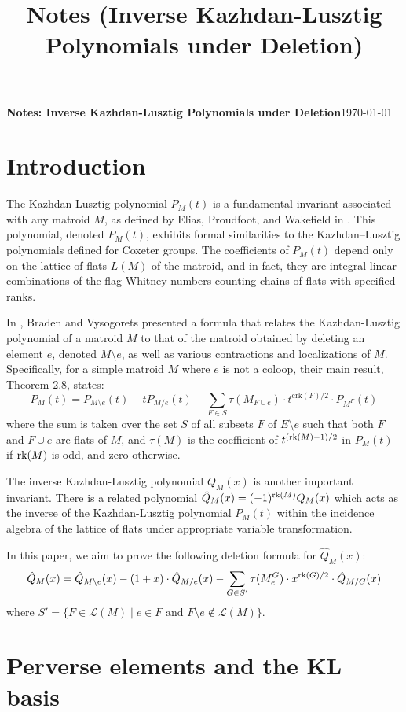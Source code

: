 \documentclass[10pt]{article}
\title{Notes (Inverse Kazhdan-Lusztig Polynomials under Deletion)}
\newcommand{\calL}{\mathcal{L}}
\newcommand{\rank}{\normalfont\text{rk}}
\theoremstyle{remark}
\begin{document}
{\textbf{Notes: Inverse Kazhdan-Lusztig Polynomials under Deletion}}\hfill {\small{\today}}

\hrulefill %

\section{Introduction}

The Kazhdan-Lusztig polynomial $P_M(t)$ is a fundamental invariant associated with any matroid $M$, as defined by Elias, Proudfoot, and Wakefield in \cite{EPW16}. This polynomial, denoted $P_M(t)$, exhibits formal similarities to the Kazhdan–Lusztig polynomials defined for Coxeter groups. The coefficients of $P_M(t)$ depend only on the lattice of flats $L(M)$ of the matroid, and in fact, they are integral linear combinations of the flag Whitney numbers counting chains of flats with specified ranks.

In \cite{Bra19}, Braden and Vysogorets presented a formula that relates the Kazhdan-Lusztig polynomial of a matroid $M$ to that of the matroid obtained by deleting an element $e$, denoted $M\setminus e$, as well as various contractions and localizations of $M$. Specifically, for a simple matroid $M$ where $e$ is not a coloop, their main result, Theorem 2.8, states:
\[
P_M(t) = P_{M\setminus e}(t) - tP_{M/e}(t) + \sum_{F\in S} \tau(M_{F\cup e})\cdot
t^{\text{crk}(F)/2}\cdot P_{M^F}(t)
\]
where the sum is taken over the set $S$ of all subsets $F$ of $E \setminus e$ such that both $F$ and $F \cup e$ are flats of $M$, and $\tau(M)$ is the coefficient of $t^{(\rank(M)-1)/2}$ in $P_M(t)$ if $\rank(M)$ is odd, and zero otherwise.

The inverse Kazhdan-Lusztig polynomial $Q_M(x)$ is another important invariant.
There is a related polynomial $\hat{Q}_M(x) = (-1)^{\rank(M)} Q_M(x)$ which acts as the inverse of the Kazhdan-Lusztig polynomial $P_M(t)$ within the incidence algebra of the lattice of flats under appropriate variable transformation. %

In this paper, we aim to prove the following deletion formula for $\hat{Q}_M(x)$:
\[
    \hat{Q}_M(x) = \hat{Q}_{M\setminus e}(x) -(1 + x)\cdot \hat{Q}_{M/e}(x) -
    \sum_{G \in S'}{\tau(M^G_e)\cdot x^{\rank(G)/2}\cdot
    \hat{Q}_{M/G}(x)}
\]
where $S' = \{F\in \calL(M)\mid e\in F \text{ and } F\setminus e \notin \calL(M)\}$.

\section{Perverse elements and the KL basis}
\label{sec:algebraic_framework}
\end{document}
